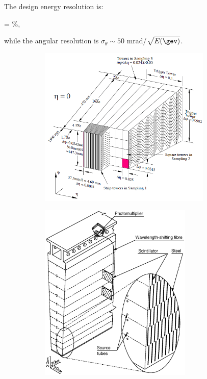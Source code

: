 The design energy resolution is:

\be
{} =   \%, 
\label{sec:det:eq:ECALresolution}
\ee

\noindent while the angular resolution is $\sigma_\theta \sim 50$ mrad/$\sqrt{E(\gev)}$.


\begin{figure}[t!]
\begin{subfigure}{0.5\textwidth}
  \centering
  \includegraphics[width=0.9\textwidth]{figures/Detector/larg_module.png}
  \caption{}
  \label{chp:det:atlas:ATLASECAL}
\end{subfigure}
\begin{subfigure}{0.5\textwidth}
  \centering
  \includegraphics[width=0.8\textwidth]{figures/Detector/TileCal_Module.eps}
  \caption{}
  \label{chp:det:atlas:ATLASTILECAL}
\end{subfigure}


\end{figure}
